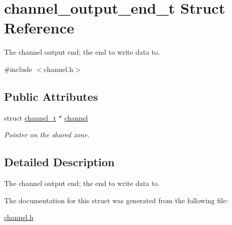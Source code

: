 \hypertarget{structchannel__output__end__t}{\section{channel\-\_\-output\-\_\-end\-\_\-t Struct Reference}
\label{structchannel__output__end__t}
}


The channel output end; the end to write data to.  




{\ttfamily \#include $<$channel.\-h$>$}

\subsection*{Public Attributes}
\begin{DoxyCompactItemize}
\item 
\hypertarget{structchannel__output__end__t_aa4cc28a9fefc5813f797c362ac00facd}{struct \hyperlink{structchannel__t}{channel\-\_\-t} $\ast$ \hyperlink{structchannel__output__end__t_aa4cc28a9fefc5813f797c362ac00facd}{channel}}\label{structchannel__output__end__t_aa4cc28a9fefc5813f797c362ac00facd}

\begin{DoxyCompactList}\small\item\em Pointer on the shared zone. \end{DoxyCompactList}\end{DoxyCompactItemize}


\subsection{Detailed Description}
The channel output end; the end to write data to. 

The documentation for this struct was generated from the following file\-:\begin{DoxyCompactItemize}
\item 
\hyperlink{channel_8h}{channel.\-h}\end{DoxyCompactItemize}
